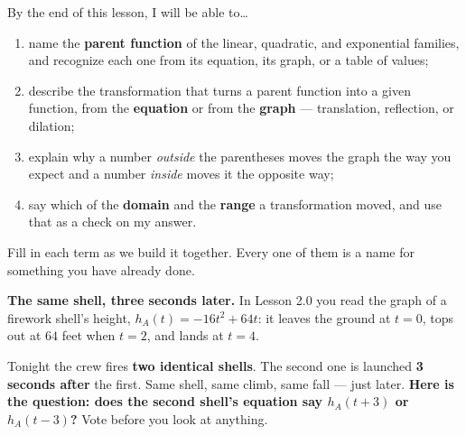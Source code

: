\documentclass[10pt]{article}
\begin{document}

\vspace{0.15in}

\begin{objectivebox}
\small
By the end of this lesson, I will be able to\dots
\begin{enumerate}[leftmargin=1.5em, itemsep=2pt, topsep=3pt]
  \item name the \textbf{parent function} of the linear, quadratic, and exponential families, and
        recognize each one from its equation, its graph, or a table of values;
  \item describe the transformation that turns a parent function into a given function, from the
        \textbf{equation} or from the \textbf{graph} --- translation, reflection, or dilation;
  \item explain why a number \emph{outside} the parentheses moves the graph the way you expect and
        a number \emph{inside} moves it the opposite way;
  \item say which of the \textbf{domain} and the \textbf{range} a transformation moved, and use
        that as a check on my answer.
\end{enumerate}
\end{objectivebox}

\vspace{0.10in}

\boxguard
\begin{vocabbox}
\small
Fill in each term as we build it together. Every one of them is a name for something you have
already done.
\end{vocabbox}

\vspace{0.10in}

\boxguard[12]
\begin{hookbox}
\small
\textbf{The same shell, three seconds later.} In Lesson 2.0 you read the graph of a firework
shell's height, $h_A(t)=-16t^2+64t$: it leaves the ground at $t=0$, tops out at $64$ feet when
$t=2$, and lands at $t=4$.

Tonight the crew fires \textbf{two identical shells}. The second one is launched \textbf{3 seconds
after} the first. Same shell, same climb, same fall --- just later. \textbf{Here is the question:
does the second shell's equation say $h_A(t+3)$ or $h_A(t-3)$?} Vote before you look at anything.

\end{hookbox}
\end{document}
